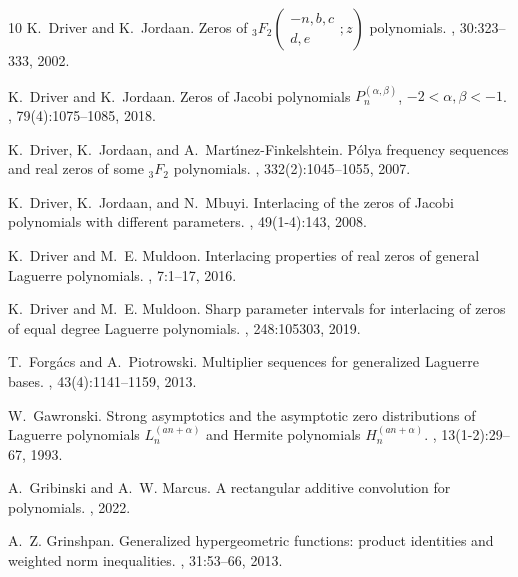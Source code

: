 \documentclass[reqno,11pt]{amsart}
\theoremstyle{remark}
\begin{document}
\begin{thebibliography}{10}
	K.~Driver and K.~Jordaan.
	\newblock Zeros of {$_3F_2\left(\begin{array}{c}-n, b, c \\ d, e \end{array}; z \right)$} polynomials.
	, 30:323--333, 2002.
	
	K.~Driver and K.~Jordaan.
	\newblock Zeros of {J}acobi polynomials {$P_n^{(\alpha,\beta)}$},
	{$-2<\alpha,\beta<-1$}.
	, 79(4):1075--1085, 2018.
	
	K.~Driver, K.~Jordaan, and A.~Mart{\'{\i}}nez-Finkelshtein.
	\newblock P{\'o}lya frequency sequences and real zeros of some {$_3F_2$} polynomials.
	, 332(2):1045--1055, 2007.
	
	K.~Driver, K.~Jordaan, and N.~Mbuyi.
	\newblock Interlacing of the zeros of Jacobi polynomials with different parameters.
	, 49(1-4):143, 2008.
	
	K.~Driver and M.~E. Muldoon.
	\newblock Interlacing properties of real zeros of general Laguerre polynomials.
	, 7:1--17, 2016.
	
	K.~Driver and M.~E. Muldoon.
	\newblock Sharp parameter intervals for interlacing of zeros of equal degree Laguerre polynomials.
	, 248:105303, 2019.
	
	T.~Forg\'{a}cs and A.~Piotrowski.
	\newblock Multiplier sequences for generalized {L}aguerre bases.
	, 43(4):1141--1159, 2013.
	
	W.~Gawronski.
	\newblock Strong asymptotics and the asymptotic zero distributions of {L}aguerre polynomials {$L_n^{(an+\alpha)}$} and {H}ermite polynomials {$H_n^{(an+\alpha)}$}.
	, 13(1-2):29--67, 1993.
	
	A.~Gribinski and A.~W. Marcus.
	\newblock A rectangular additive convolution for polynomials.
	, 2022.
	
	A.~Z. Grinshpan.
	\newblock Generalized hypergeometric functions: product identities and weighted norm inequalities.
	, 31:53--66, 2013.
	

\end{thebibliography}
\end{document}
